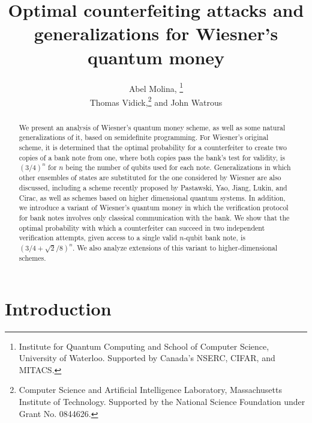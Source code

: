\documentclass[11pt,letterpaper]{article}
\theoremstyle{definition}
\newcommand{\footremember}[2]{%
   \footnote{#2}
    \newcounter{#1}
    \setcounter{#1}{\value{footnote}}%
}
\newcommand{\footrecall}[1]{%
    \footnotemark[\value{#1}]%
}
\begin{document}
\title{Optimal counterfeiting attacks and generalizations for
  Wiesner's quantum money}

\author{
  Abel Molina,\footremember{1}{%
    Institute for Quantum Computing and School of Computer Science, 
    University of Waterloo.
    Supported by Canada's NSERC, CIFAR, and MITACS.} 
  \quad
  Thomas Vidick,\footnote{%
    Computer Science and Artificial Intelligence Laboratory, 
    Massachusetts Institute of Technology. 
    Supported by the National Science Foundation under Grant No. 0844626.}
  \quad and\quad
  John Watrous\footrecall{1}
}

\maketitle       

\begin{abstract}
  We present an analysis of Wiesner's quantum money scheme, as well as
  some natural generalizations of it, based on semidefinite
  programming.
  For Wiesner's original scheme, it is determined that the optimal
  probability for a counterfeiter to create two copies of a bank note
  from one, where both copies pass the bank's test for validity, is
  $(3/4)^n$ for $n$ being the number of qubits used for each note.
  Generalizations in which other ensembles of states are substituted
  for the one considered by Wiesner are also discussed, including
  a scheme recently proposed by Pastawski, Yao, Jiang, Lukin, and
  Cirac, as well as schemes based on higher dimensional quantum
  systems.
  In addition, we introduce a variant of Wiesner's quantum money in
  which the verification protocol for bank notes involves only
  classical communication with the bank. We show that the optimal
  probability with which a counterfeiter can succeed in two
  independent verification attempts, given access to a single valid
  $n$-qubit bank note, is $(3/4+\sqrt{2}/8)^n$.
  We also analyze extensions of this variant to higher-dimensional
  schemes.
\end{abstract}


\section{Introduction}
\end{document}
